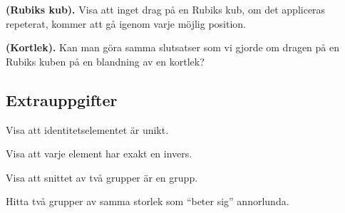 \documentclass[11pt,fleqn]{book} %
\begin{document}
\begin{problem} \textbf{(Rubiks kub).}
  Visa att inget drag på en Rubiks kub, om det appliceras repeterat, kommer att gå igenom varje möjlig position.
\end{problem}

\begin{problem} \textbf{(Kortlek).}
  Kan man göra samma slutsatser som vi gjorde om dragen på en Rubiks kuben på en blandning av en kortlek?
\end{problem}

\subsection*{Extrauppgifter}
\begin{problem} %
  Visa att identitetselementet är unikt.
\end{problem}

\begin{problem}
  Visa att varje element har exakt en invers.
\end{problem}

\begin{problem}
  Visa att snittet av två grupper är en grupp.
\end{problem}

\begin{problem}
  Hitta två grupper av samma storlek som ``beter sig'' annorlunda.
\end{problem}


\end{document}
